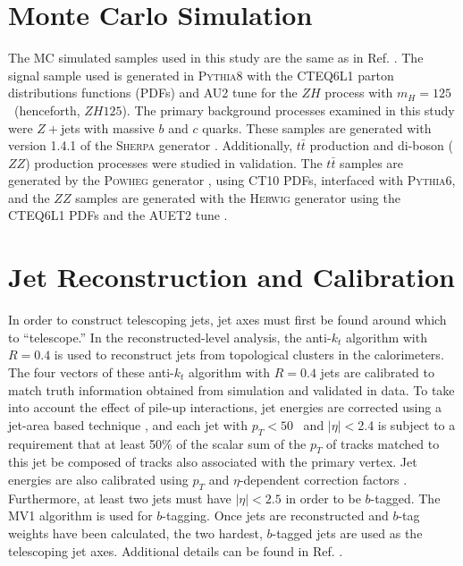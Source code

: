 \section{Monte Carlo Simulation}
\label{sec:mc}
The MC simulated samples used in this study are the same as in Ref. \cite{conf}.  The signal sample used is generated in \textsc{Pythia8} \cite{conf18} with the CTEQ6L1 parton distributions functions (PDFs) and AU2 tune\cite{conf19,conf20,conf21} for the $ZH$ process with $m_H=125$ \GeV\ (henceforth, $ZH125$).  The primary background processes examined in this study were $Z+$jets with massive $b$ and $c$ quarks.  These samples are generated with version 1.4.1 of the \textsc{Sherpa} generator \cite{conf28}.%
  Additionally, $t\bar{t}$ production and di-boson ($ZZ$) production processes were studied in validation.  The $t\bar{t}$ samples are generated by the \textsc{Powheg} generator \cite{conf30,conf32}, using CT10 PDFs, interfaced with \textsc{Pythia6}, and the $ZZ$ samples are generated with the \textsc{Herwig} \cite{conf40} generator using the CTEQ6L1 PDFs and the AUET2 tune \cite{conf20,conf21}.

\section{Jet Reconstruction and Calibration}
\label{sec:cal}
In order to construct telescoping jets, jet axes must first be found around which to ``telescope.''  In the reconstructed-level analysis, the anti-$k_t$ algorithm with $R=0.4$ is used to reconstruct jets from topological clusters in the calorimeters.  The four vectors of these anti-$k_t$ algorithm with $R=0.4$ jets are calibrated to match truth information obtained from simulation and validated in data.  To take into account the effect of pile-up interactions, jet energies are corrected using a jet-area based technique \cite{conf54}, and each jet with $p_T<50$ \GeV\ and $\left|\eta\right|<$2.4 is subject to a requirement that at least 50\% of the scalar sum of the $p_T$ of tracks matched to this jet be composed of tracks also associated with the primary vertex.  Jet energies are also calibrated using $p_T$ and $\eta$-dependent correction factors \cite{conf55}.  Furthermore, at least two jets must have $\left|\eta\right|<2.5$ in order to be $b$-tagged.  The MV1 algorithm \cite{conf56,conf57,conf58,conf59,conf60} is used for $b$-tagging.  Once jets are reconstructed and $b$-tag weights have been calculated, the two hardest, $b$-tagged jets are used as the telescoping jet axes.  Additional details can be found in Ref. \cite{conf}.

